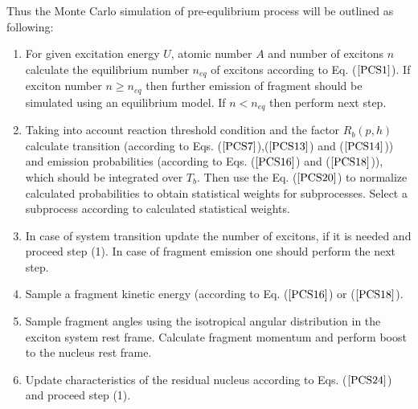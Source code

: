 \hspace{1.0em}Thus the Monte Carlo simulation of pre-equlibrium process
will be outlined as following:
\begin{enumerate}
\item For given excitation energy $U$, atomic number $A$ and number of excitons
 $n$ calculate the equilibrium number $n_{eq}$ of excitons according to
 Eq. ($\ref{PCS1}$).  If exciton number $n \geq n_{eq}$ then further
 emission of fragment should be simulated using an equilibrium model. If
 $n < n_{eq}$ then perform next step.
 
\item Taking into account reaction threshold condition  and 
the factor $R_b(p,h)$ calculate transition (according to Eqs.
($\ref{PCS7}$),($\ref{PCS13}$) and ($\ref{PCS14}$)) and emission
probabilities (according to Eqs. ($\ref{PCS16}$) and ($\ref{PCS18}$)), 
which should be
integrated over $T_b$. Then
use the Eq. ($\ref{PCS20}$) to normalize calculated probabilities to
obtain statistical weights for subprocesses.  Select a subprocess
according to calculated statistical weights.

\item In case of system
transition update the number of excitons, if it is needed and proceed
step (1). In case of fragment emission one should perform the next step.

\item Sample a fragment kinetic energy (according to Eq. ($\ref{PCS16}$) or 
 ($\ref{PCS18}$).
 
\item Sample fragment angles using the isotropical
angular distribution in the exciton system rest frame. Calculate
fragment momentum and perform boost to the nucleus rest frame.

\item Update characteristics of the residual nucleus according to Eqs.
($\ref{PCS24}$) and proceed step (1).
\end{enumerate}
      
